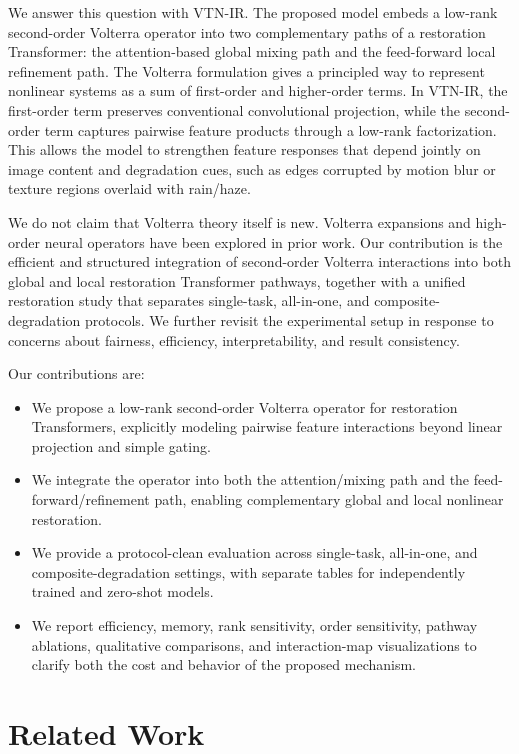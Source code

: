 \documentclass[10pt,twocolumn]{article}
\newcommand{\ours}{VTN-IR}
\begin{document}
We answer this question with \ours. The proposed model embeds a low-rank second-order Volterra operator into two complementary paths of a restoration Transformer: the attention-based global mixing path and the feed-forward local refinement path. The Volterra formulation gives a principled way to represent nonlinear systems as a sum of first-order and higher-order terms. In \ours, the first-order term preserves conventional convolutional projection, while the second-order term captures pairwise feature products through a low-rank factorization. This allows the model to strengthen feature responses that depend jointly on image content and degradation cues, such as edges corrupted by motion blur or texture regions overlaid with rain/haze.

We do not claim that Volterra theory itself is new. Volterra expansions and high-order neural operators have been explored in prior work. Our contribution is the efficient and structured integration of second-order Volterra interactions into both global and local restoration Transformer pathways, together with a unified restoration study that separates single-task, all-in-one, and composite-degradation protocols. We further revisit the experimental setup in response to concerns about fairness, efficiency, interpretability, and result consistency.

Our contributions are:
\begin{itemize}[leftmargin=*]
    \item We propose a low-rank second-order Volterra operator for restoration Transformers, explicitly modeling pairwise feature interactions beyond linear projection and simple gating.
    \item We integrate the operator into both the attention/mixing path and the feed-forward/refinement path, enabling complementary global and local nonlinear restoration.
    \item We provide a protocol-clean evaluation across single-task, all-in-one, and composite-degradation settings, with separate tables for independently trained and zero-shot models.
    \item We report efficiency, memory, rank sensitivity, order sensitivity, pathway ablations, qualitative comparisons, and interaction-map visualizations to clarify both the cost and behavior of the proposed mechanism.
\end{itemize}

\section{Related Work}
\end{document}
